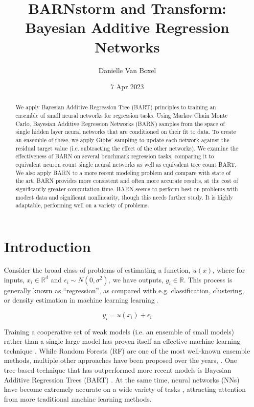 \documentclass[12pt]{article}
\title{BARNstorm and Transform: Bayesian Additive Regression Networks}
\author{Danielle Van Boxel}
\date{7 Apr 2023}
\begin{document}
\maketitle

\begin{abstract}

    We apply Bayesian Additive Regression Tree (BART) principles to training an ensemble of small neural networks for regression tasks.  Using Markov Chain Monte Carlo, Bayesian Additive Regression Networks (BARN) samples from the space of single hidden layer neural networks that are conditioned on their fit to data.  To create an ensemble of these, we apply Gibbs' sampling to update each network against the residual target value (i.e. subtracting the effect of the other networks).  We examine the effectiveness of BARN on several benchmark regression tasks, comparing it to equivalent neuron count single neural networks as well as equivalent tree count BART.  We also apply BARN to a more recent modeling problem and compare with state of the art.  BARN provides more consistent and often more accurate results, at the cost of significantly greater computation time.  BARN seems to perform best on problems with modest data and significant nonlinearity, though this needs further study.  It is highly adaptable, performing well on a variety of problems.
\end{abstract}

\section{Introduction}\label{sec:intro}


Consider the broad class of problems of estimating a function, $u(x)$, where for inputs, $x_i \in \mathbb{R}^d$ and $\epsilon_i \sim N(0,\sigma^2)$, we have outputs, $y_i \in \mathbb{R}$.  This process is generally known as ``regression'', as compared with e.g. classification, clustering, or density estimation in machine learning learning \cite{hastie2009elements}.

$$
y_i = u(x_i) + \epsilon_i
$$

Training a cooperative set of weak models (i.e. an ensemble of small models) rather than a single large model has proven itself an effective machine learning technique \cite{dietterich2000ensemble,hansen1990neural,seni2010ensemble,lee2020comparing}.  While Random Forests (RF) \cite{ho1995random,breiman2001random} are one of the most well-known ensemble methods, multiple other approaches have been proposed over the years, \cite[provide some reviews]{way2012advances,dong2020survey}.  One tree-based technique that has outperformed more recent models \cite{biau2019neural} is Bayesian Additive Regression Trees (BART) \cite{chipman2010bart}.  At the same time, neural networks (NNs) have become extremely accurate on a wide variety of tasks \cite{schmidhuber2015deep}, attracting attention from more traditional machine learning methods.
\end{document}

